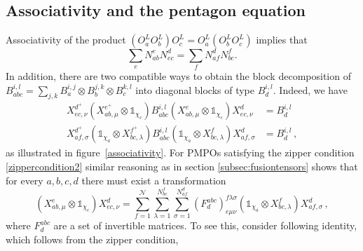 \documentclass[12 pt]{article}
\begin{document}
\subsection{Associativity and the pentagon equation}\label{subsec:associativity}
Associativity of the product $(O_a^L O_b^L) O_c^L = O_a^L (O_b^L O_c^L)$ implies that
\begin{equation}
\sum_e N_{ab}^{e} N_{ec}^{d} = \sum_{f} N_{af}^{d} N_{bc}^{f}.
\end{equation}
In addition, there are two compatible ways to obtain the block decomposition of $B_{abc}^{i,l}=\sum_{j,k} B_a^{i,j}\otimes B_{b}^{j,k} \otimes B_{c}^{k,l}$ into diagonal blocks of type $B_{d}^{i,l}$. Indeed, we have
\begin{align*}
X^{d^+}_{ec,\nu}\left(X^{e^+}_{ab,\mu}\otimes\mathds{1}_{\chi_c}\right)B_{abc}^{i,l}\left(X^{e}_{ab,\mu}\otimes\mathds{1}_{\chi_c}\right)X^{d}_{ec,\nu}&= B_{d}^{i,l} \\
{X^{d^+}_{af,\sigma}}\left(\mathds{1}_{\chi_a} \otimes X^{f^+}_{bc,\lambda}\right) B_{abc}^{i,l} \left(\mathds{1}_{\chi_a}\otimes X^{f}_{bc,\lambda}\right)X^{d}_{af,\sigma} &= B_{d}^{i,l}\, ,
\end{align*}
as illustrated in figure~\ref{associativity}. For PMPOs satisfying the zipper condition \eqref{zippercondition2} similar reasoning as in section \ref{subsec:fusiontensors} shows that for every $a,b,c,d$ there must exist a transformation
\begin{equation}\label{Fmove}
\left(X^e_{ab,\mu}\otimes\mathds{1}_{\chi_c}\right)X^d_{ec,\nu} =
\sum_{f=1}^{\mathcal{N}} \sum_{\lambda = 1}^{N_{bc}^f} \sum_{\sigma = 1}^{N_{af}^d}(F^{abc}_{d})^{f\lambda\sigma}_{e\mu\nu} \left(\mathds{1}_{\chi_a}\otimes X^f_{bc,\lambda}\right)X^d_{af,\sigma}\, ,
\end{equation}
where $F^{abc}_d$ are a set of invertible matrices. To see this, consider following identity, which follows from the zipper condition,
\end{document}
